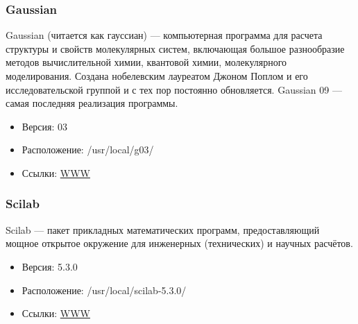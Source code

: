 \documentclass[a4paper,8pt]{extreport}
\begin{document}
\subsubsection{Gaussian}
Gaussian (читается как гауссиан) — компьютерная программа для расчета структуры и свойств молекулярных 
систем, включающая большое разнообразие методов вычислительной химии, квантовой химии, молекулярного 
моделирования. Создана нобелевским лауреатом Джоном Поплом и его исследовательской группой и с тех пор 
постоянно обновляется. Gaussian 09 — самая последняя реализация программы.
\begin{itemize}
 \item Версия: 03
 \item Расположение: /usr/local/g03/
 \item Ссылки: \href{http://www.gaussian.com/}{WWW}
\end{itemize}

\subsubsection{Scilab}
Scilab — пакет прикладных математических программ, предоставляющий мощное открытое окружение для
инженерных (технических) и научных расчётов.
\begin{itemize}
 \item Версия: 5.3.0
 \item Расположение: /usr/local/scilab-5.3.0/
 \item Ссылки: \href{http://www.scilab.org/}{WWW}
\end{itemize}



\end{document}
